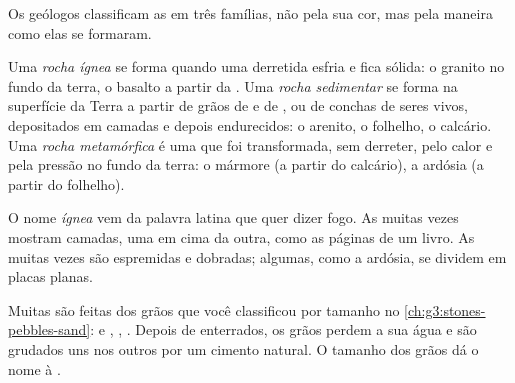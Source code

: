 Os geólogos classificam as  em três famílias, não pela sua cor, mas
pela maneira como elas se formaram.

\begin{definition}\label{def:g6:rocks-and-minerals:rock-families}
Uma \emph{rocha ígnea} se forma quando uma  derretida
esfria e fica sólida: o granito no fundo da terra, o basalto a partir da
. Uma \emph{rocha sedimentar} se forma na
superfície da Terra a partir de grãos de  e de , ou de conchas de
seres vivos, depositados em camadas e depois endurecidos: o arenito, o
folhelho, o calcário. Uma \emph{rocha metamórfica} é
uma  que foi transformada, sem derreter, pelo calor e pela pressão no
fundo da terra: o mármore (a partir do calcário), a ardósia (a partir do
folhelho).
\end{definition}

O nome \emph{ígnea} vem da palavra latina que quer dizer fogo. As  muitas vezes mostram camadas, uma em cima da outra, como as
páginas de um livro. As  muitas vezes são espremidas e
dobradas; algumas, como a ardósia, se dividem em placas planas.

Muitas  são feitas dos grãos que você classificou por
tamanho no \cref{ch:g3:stones-pebbles-sand}:  e , ,
. Depois de enterrados, os grãos perdem a sua água e são grudados uns
nos outros por um cimento natural. O tamanho dos grãos dá o nome à .

